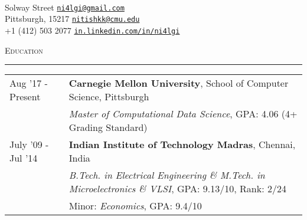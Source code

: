 \documentclass[8pt,a4paper,English]{article}
\newcommand{\lv}{\color{table-border}\vrule}
\newcommand\roottitle[1]{ \vspace{3mm} \noindent \textsc{ \normalsize #1} \vspace{1.5mm} \nopagebreak[4] \color{gray} \hrule \color{black} \vspace{2mm} \noindent \small }
\begin{document}
 \\
\vspace{-2mm}

\begin{normalsize}
	 Solway Street \hfill
	\href{mailto:ni4lgi@gmail.com}{\texttt{ni4lgi\mbox{}@\mbox{}gmail.com}} \\
	Pittsburgh, 15217 \hfill
	\href{mailto:nitishkk@cmu.edu}{\texttt{nitishkk\mbox{}@\mbox{}cmu.edu}} \\
	+1 (412) 503 2077 \hfill
    \href{https://www.linkedin.com/in/ni4lgi}{\texttt{in.linkedin.com/in/ni4lgi}} \\
\end{normalsize}




\roottitle{Education}
\renewcommand{\arraystretch}{1.2}
\setlength\tabcolsep{8pt}
\begin{tabularx}{\textwidth}{R{2.6cm} !{\lv} X}
  Aug '17 - Present  	& \textbf{Carnegie Mellon University}, School of Computer Science, Pittsburgh\\
						& \textit{Master of Computational Data Science}, GPA: 4.06 (4+ Grading Standard) \\
  July '09 - Jul '14    & \textbf{Indian Institute of Technology Madras}, Chennai, India \\
                        & \textit{B.Tech. in Electrical Engineering \& M.Tech. in Microelectronics \& VLSI}, GPA: 9.13/10, Rank: 2/24\\
                        & Minor: \textit{Economics}, GPA: 9.4/10 \\
\end{tabularx}

\end{document}
